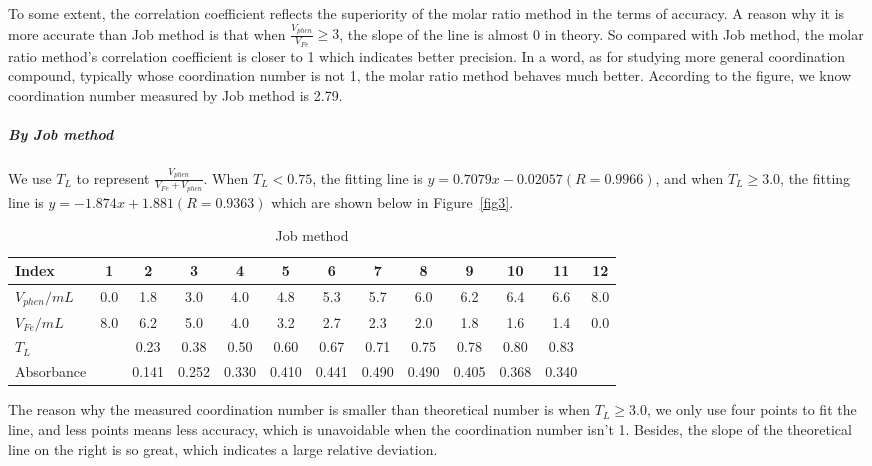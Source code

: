 
To some extent, the correlation coefficient reflects the superiority of the molar ratio method in the terms of accuracy. A reason why it is more accurate than Job method is that when $\frac{V_{phen}}{V_{Fe}}\geq3$, the slope of the line is almost 0 in theory. So compared with Job method, the molar ratio method’s correlation coefficient is closer to 1 which indicates better precision. In a word, as for studying more general coordination compound, typically whose coordination number is not 1, the molar ratio method behaves much better. According to the figure, we know coordination number measured by Job method is 2.79.

\subparagraph{By Job method}

We use $T_L$ to represent $\frac{V_{phen}}{V_{Fe}+V_{phen}}$. When $T_L<0.75$, the fitting line is $y=0.7079x-0.02057(R=0.9966)$, and when $T_L\geq3.0$, the fitting line is $y=-1.874x+1.881(R=0.9363)$ which are shown below in Figure~\ref{fig3}.

\begin{table}[H]
    \caption{Job method}
    \label{tab.Jbm}
    \begin{tabular}{lcccccccccccc}
    \toprule
    Index
    & 1 & 2 & 3 & 4 & 5 & 6 & 7 & 8 & 9 & 10& 11& 12\\
    \midrule
    $V_{phen}/mL$
    &0.0&1.8&3.0&4.0&4.8&5.3&5.7&6.0&6.2&6.4&6.6&8.0\\
    $V_{Fe}/mL$
    &8.0&6.2&5.0&4.0&3.2&2.7&2.3&2.0&1.8&1.6&1.4&0.0\\
    $T_L$
    &   &0.23&0.38&0.50&0.60&0.67&0.71&0.75&0.78&0.80&0.83& \\
    Absorbance
    &   &0.141&0.252&0.330&0.410&0.441&0.490&0.490&0.405&0.368&0.340& \\
    \bottomrule
    \end{tabular}
\end{table}


The reason why the measured coordination number is smaller than theoretical number is when $T_L\geq3.0$, we only use four points to fit the line, and less points means less accuracy, which is unavoidable when the coordination number isn't 1. Besides, the slope of the theoretical line on the right is so great, which indicates a large relative deviation.

